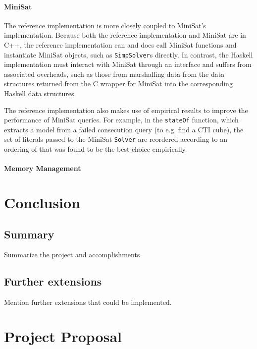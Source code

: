 \documentclass[12pt,a4paper,twoside,openright]{report}
\begin{document}
\subsubsection{MiniSat}
The reference implementation is more closely coupled to MiniSat's implementation. Because both the reference
implementation and MiniSat are in C++, the reference implementation can and does call MiniSat functions
and instantiate MiniSat objects, such as \verb,SimpSolver,s directly. In contrast, the Haskell implementation
must interact with MiniSat through an interface and suffers from associated overheads, such as those from
marshalling data from the data structures returned from the C wrapper for MiniSat into the corresponding
Haskell data structures.

The reference implementation also makes use of empirical results to improve the performance of MiniSat queries.
For example, in the \verb,stateOf, function, which extracts a model from a failed consecution query
(to e.g. find a CTI cube), the set of literals passed to the MiniSat \verb,Solver, are reordered according
to an ordering of that was found to be the best choice empirically.

\subsubsection{Memory Management}

\chapter{Conclusion}

\section{Summary}
Summarize the project and accomplishments

\section{Further extensions}
Mention further extensions that could be implemented.




\appendix

\chapter{Project Proposal}


\end{document}
